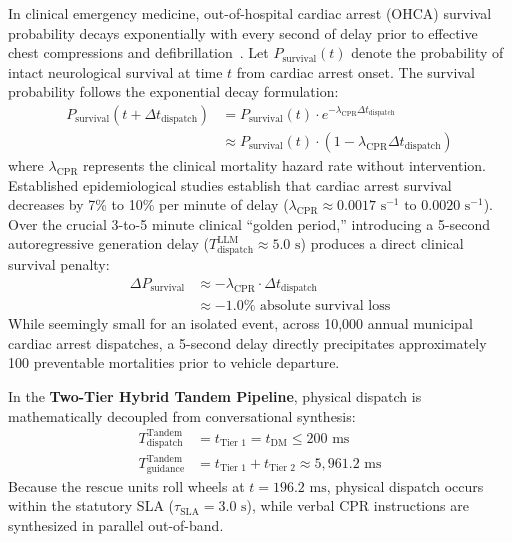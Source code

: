 \documentclass[journal,compsoc]{IEEEtran}
\begin{document}
In clinical emergency medicine, out-of-hospital cardiac arrest (OHCA) survival probability decays exponentially with every second of delay prior to effective chest compressions and defibrillation~\cite{eisenberg2001cardiac}. Let $P_{\text{survival}}(t)$ denote the probability of intact neurological survival at time $t$ from cardiac arrest onset. The survival probability follows the exponential decay formulation:
\begin{equation}
\begin{aligned}
P_{\text{survival}}(t + \Delta t_{\text{dispatch}}) &= P_{\text{survival}}(t) \cdot e^{-\lambda_{\text{CPR}} \Delta t_{\text{dispatch}}} \\
&\approx P_{\text{survival}}(t) \cdot (1 - \lambda_{\text{CPR}} \Delta t_{\text{dispatch}})
\end{aligned}
\end{equation}
where $\lambda_{\text{CPR}}$ represents the clinical mortality hazard rate without intervention. Established epidemiological studies establish that cardiac arrest survival decreases by 7\% to 10\% per minute of delay ($\lambda_{\text{CPR}} \approx 0.0017 \text{ s}^{-1} \text{ to } 0.0020 \text{ s}^{-1}$). Over the crucial 3-to-5 minute clinical ``golden period,'' introducing a 5-second autoregressive generation delay ($T_{\text{dispatch}}^{\text{LLM}} \approx 5.0 \text{ s}$) produces a direct clinical survival penalty:
\begin{equation}
\begin{aligned}
\Delta P_{\text{survival}} &\approx - \lambda_{\text{CPR}} \cdot \Delta t_{\text{dispatch}} \\
&\approx -1.0\% \text{ absolute survival loss}
\end{aligned}
\end{equation}
While seemingly small for an isolated event, across 10,000 annual municipal cardiac arrest dispatches, a 5-second delay directly precipitates approximately 100 preventable mortalities prior to vehicle departure.

In the \textbf{Two-Tier Hybrid Tandem Pipeline}, physical dispatch is mathematically decoupled from conversational synthesis:
\begin{equation}
\begin{aligned}
T_{\text{dispatch}}^{\text{Tandem}} &= t_{\text{Tier 1}} = t_{\text{DM}} \le 200 \text{ ms} \\
T_{\text{guidance}}^{\text{Tandem}} &= t_{\text{Tier 1}} + t_{\text{Tier 2}} \approx 5{,}961.2 \text{ ms}
\end{aligned}
\end{equation}
Because the rescue units roll wheels at $t = 196.2 \text{ ms}$, physical dispatch occurs within the statutory SLA ($\tau_{\text{SLA}} = 3.0 \text{ s}$), while verbal CPR instructions are synthesized in parallel out-of-band.
\end{document}
